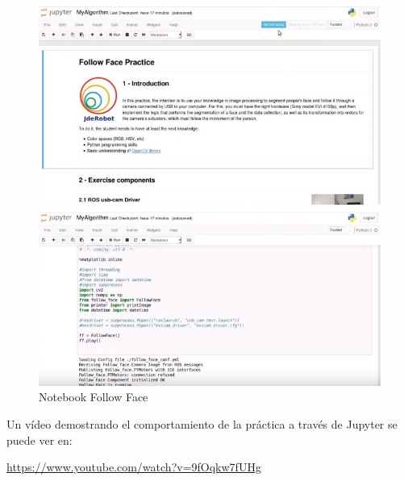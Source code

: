 \begin{figure}[H]
  \begin{center}
    \includegraphics[width=0.98\linewidth]{figures/notebookff.jpg}
		\caption{Notebook Follow Face}
		\label{fig.notebook}
		\end{center}
\end{figure}

Un vídeo demostrando el comportamiento de la práctica a través de Jupyter se puede ver en:

\url{https://www.youtube.com/watch?v=9fOqkw7fUHg}

